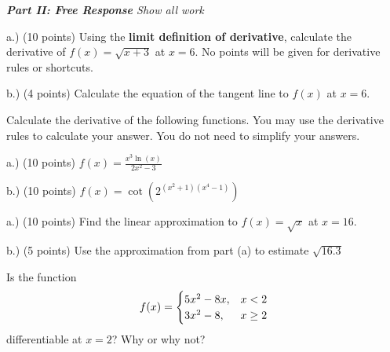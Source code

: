 \documentclass[11pt]{article}
\begin{document}
\begin{questions}
\begin{multiplechoice}{5}
\end{multiplechoice}
\vspace{.2in}

\newpage

\noindent \emph{{\bf Part II: Free Response}{  Show all work}}
\question[14]  

a.) (10 points) Using the \textbf{limit definition of derivative}, calculate the derivative of $f(x) = \sqrt{x + 3}$ at $x = 6$.
No points will be given for derivative rules or shortcuts.
\vspace{4.25in}

b.) (4 points) Calculate the equation of the tangent line to $f(x)$ at $x = 6$.


\newpage


\question[20] Calculate the derivative of the following functions. You may use the derivative rules to calculate
your answer. You do not need to simplify your answers.

a.) (10 points) $\displaystyle f(x) = \frac{x^3 \ln(x)}{2x^2 -3}$
\vspace{3.25in}

b.) (10 points) $\displaystyle f(x) = \cot(2^{(x^2 + 1)(x^4 - 1)})$
\vspace{3.25in}

\newpage

\question[15]  

a.) (10 points) Find the linear approximation to $f(x) = \sqrt{x}$ at $x = 16$.

\vspace{2.25in}

b.) (5 points) Use the approximation from part (a) to estimate $\sqrt{16.3}$

\vspace{1.25in}


\question[15] Is the function
$$\begin{displaystyle}
f(x) = \begin{cases}
5x^2 - 8x, & x < 2 \\
3x^2 - 8, & x \ge 2
\end{cases}
\end{displaystyle}
$$
differentiable at $x = 2$? Why or why not?

\mbox{}
\end{questions}
\end{document}
